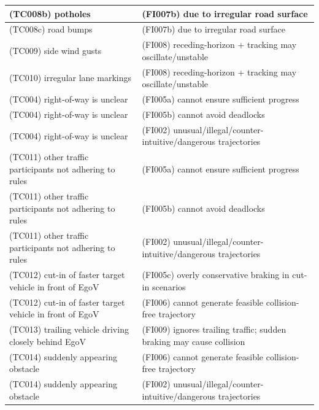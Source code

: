 \begin{longtable}{|p{8cm}|p{8cm}|}
\cellcolor{cRed}(TC008b) potholes& \cellcolor{cBlue}(FI007b) due to irregular road surface\\\hline
\cellcolor{cRed}(TC008c) road bumps& \cellcolor{cBlue}(FI007b) due to irregular road surface\\\hline
\cellcolor{cRed}(TC009) side wind gusts& \cellcolor{cBlue}(FI008) receding-horizon + tracking may oscillate/unstable\\\hline
\cellcolor{cYellow}(TC010) irregular lane markings& \cellcolor{cBlue}(FI008) receding-horizon + tracking may oscillate/unstable\\\hline
\cellcolor{cYellow}(TC004) right-of-way is unclear& \cellcolor{cBlue}(FI005a) cannot ensure sufficient progress\\\hline
\cellcolor{cYellow}(TC004) right-of-way is unclear& \cellcolor{cBlue}(FI005b) cannot avoid deadlocks\\\hline
\cellcolor{cYellow}(TC004) right-of-way is unclear& \cellcolor{cBlue}(FI002) unusual/illegal/counter-intuitive/dangerous trajectories\\\hline
\cellcolor{cGreen}(TC011) other traffic participants not adhering to rules& \cellcolor{cBlue}(FI005a) cannot ensure sufficient progress\\\hline
\cellcolor{cGreen}(TC011) other traffic participants not adhering to rules& \cellcolor{cBlue}(FI005b) cannot avoid deadlocks\\\hline
\cellcolor{cGreen}(TC011) other traffic participants not adhering to rules& \cellcolor{cBlue}(FI002) unusual/illegal/counter-intuitive/dangerous trajectories\\\hline
\cellcolor{cGreen}(TC012) cut-in of faster target vehicle in front of EgoV& \cellcolor{cBlue}(FI005c) overly conservative braking in cut-in scenarios\\\hline
\cellcolor{cGreen}(TC012) cut-in of faster target vehicle in front of EgoV& \cellcolor{cBlue}(FI006) cannot generate feasible collision-free trajectory\\\hline
\cellcolor{cGreen}(TC013) trailing vehicle driving closely behind EgoV& \cellcolor{cGray}(FI009) ignores trailing traffic; sudden braking may cause collision\\\hline
\cellcolor{cGreen}(TC014) suddenly appearing obstacle& \cellcolor{cBlue}(FI006) cannot generate feasible collision-free trajectory\\\hline
\cellcolor{cGreen}(TC014) suddenly appearing obstacle& \cellcolor{cBlue}(FI002) unusual/illegal/counter-intuitive/dangerous trajectories\\\hline

\end{longtable}

